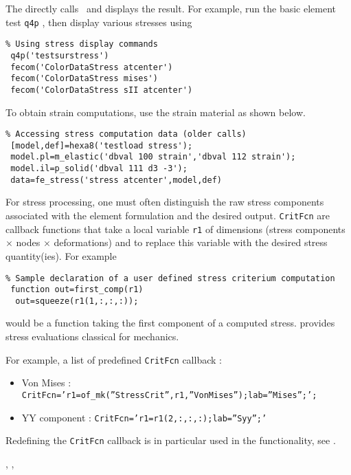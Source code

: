 \begin{SDT}
The  directly calls \festress\ and displays the result. For example, run the basic element test {\tt q4p} , then display various stresses using
\begin{verbatim}
% Using stress display commands
 q4p('testsurstress')
 fecom('ColorDataStress atcenter')
 fecom('ColorDataStress mises')
 fecom('ColorDataStress sII atcenter')
\end{verbatim}%
\end{SDT}

To obtain strain computations, use the strain material as shown below.

\begin{verbatim}
% Accessing stress computation data (older calls)
 [model,def]=hexa8('testload stress');
 model.pl=m_elastic('dbval 100 strain','dbval 112 strain');
 model.il=p_solid('dbval 111 d3 -3');
 data=fe_stress('stress atcenter',model,def)
\end{verbatim}%


For stress processing, one must often distinguish the raw stress components associated with the element formulation and the desired output. {\tt CritFcn} are callback functions that take a local variable {\tt r1} of dimensions (stress components $\times$ nodes $\times$ deformations) and to replace this variable with the desired stress quantity(ies). For example 

\begin{verbatim}
% Sample declaration of a user defined stress criterium computation
 function out=first_comp(r1)
  out=squeeze(r1(1,:,:,:));
\end{verbatim}

would be a function taking the first component of a computed stress.  provides stress evaluations classical for mechanics.

For example, a list of predefined {\tt CritFcn} callback :
\begin{itemize}
\item Von Mises : {\tt CritFcn='r1=of\_mk(''StressCrit'',r1,''VonMises'');lab=''Mises'';';}
\item YY component : {\tt CritFcn='r1=r1(2,:,:,:);lab=''Syy'';'}
\end{itemize}


Redefining the {\tt CritFcn} callback is in particular used in the  functionality, see .


\noindent \femk, \feplot, \fecom

